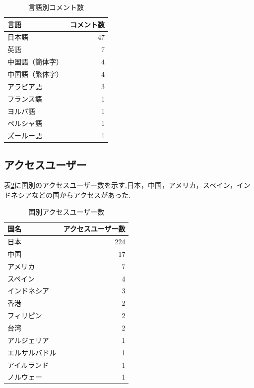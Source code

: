 \documentclass[b5paper,12pt,dvipdfmx]{jsreport}
\begin{document}
\begin{table}[H]
    \centering
    \caption{言語別コメント数}
    \label{tab:language-detection}
    \begin{tabular}{|l|r|}
        \hline
        \textbf{言語} & \textbf{コメント数} \\ \hline
        日本語       & 47           \\
        英語         & 7             \\
        中国語（簡体字） & 4             \\
        中国語（繁体字） & 4             \\ 
        アラビア語     & 3             \\
        フランス語     & 1             \\
        ヨルバ語       & 1             \\
        ペルシャ語     & 1             \\
        ズールー語     & 1             \\\hline
    \end{tabular}
\end{table}

\subsection{アクセスユーザー}
表\ref{table:user-by-country}に国別のアクセスユーザー数を示す.日本，中国，アメリカ，スペイン，インドネシアなどの国からアクセスがあった.

\begin{table}[H]
    \centering
    \caption{国別アクセスユーザー数}
    \label{table:user-by-country}
    \begin{tabular}{|l|r|}
        \hline
        \textbf{国名} & \textbf{アクセスユーザー数} \\
        \hline
        日本     & 224 \\
        中国     & 17 \\
        アメリカ & 7 \\
        スペイン & 4 \\
        インドネシア & 3 \\
        香港 & 2  \\
        フィリピン   & 2  \\
        台湾 & 2 \\
        アルジェリア   & 1 \\
        エルサルバドル   & 1 \\
        アイルランド   & 1  \\
        ノルウェー & 1  \\
        \hline
    \end{tabular}
\end{table}
\end{document}
